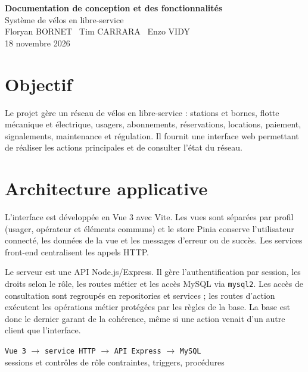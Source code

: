 \documentclass[11pt,a4paper]{article}
\begin{document}
\begin{center}
{\LARGE\textbf{Documentation de conception et des fonctionnalités}}\\[0.4em]
{\large Système de vélos en libre-service}\\[0.8em]
Floryan BORNET \textperiodcentered\ Tim CARRARA \textperiodcentered\ Enzo VIDY\\
18 novembre 2026
\end{center}

\section{Objectif}
Le projet gère un réseau de vélos en libre-service : stations et bornes, flotte mécanique et électrique, usagers, abonnements, réservations, locations, paiement, signalements, maintenance et régulation. Il fournit une interface web permettant de réaliser les actions principales et de consulter l'état du réseau.

\section{Architecture applicative}
L'interface est développée en Vue 3 avec Vite. Les vues sont séparées par profil (usager, opérateur et éléments communs) et le store Pinia conserve l'utilisateur connecté, les données de la vue et les messages d'erreur ou de succès. Les services front-end centralisent les appels HTTP.

Le serveur est une API Node.js/Express. Il gère l'authentification par session, les droits selon le rôle, les routes métier et les accès MySQL via \texttt{mysql2}. Les accès de consultation sont regroupés en repositories et services ; les routes d'action exécutent les opérations métier protégées par les règles de la base. La base est donc le dernier garant de la cohérence, même si une action venait d'un autre client que l'interface.

\begin{center}
\texttt{Vue 3} $\longrightarrow$ \texttt{service HTTP} $\longrightarrow$ \texttt{API Express} $\longrightarrow$ \texttt{MySQL}\\
\hfill sessions et contrôles de rôle \hfill contraintes, triggers, procédures \hfill
\end{center}
\end{document}
